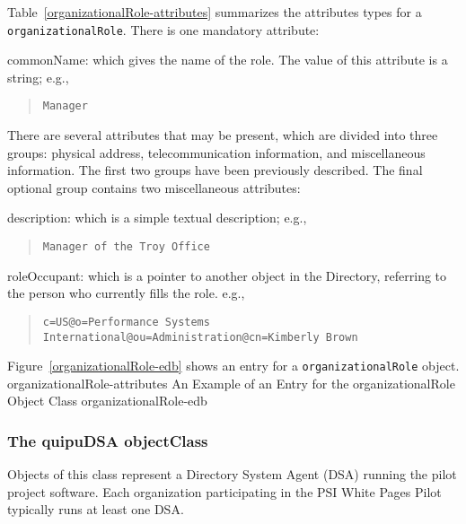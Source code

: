 Table~\ref{organizationalRole-attributes} summarizes the attributes types for
a \verb"organizationalRole".
There is one mandatory attribute:
\begin{describe}
\item[commonName:]
			which gives the name of the role.
			The value of this attribute is a string; e.g.,
\begin{quote}\small\begin{verbatim}
Manager
\end{verbatim}\end{quote}
\end{describe}
There are several attributes that may be present,
which are divided into three groups:
physical address, telecommunication information, 
and miscellaneous information.
The first two groups have been previously described.
The final optional group contains two miscellaneous attributes:
\begin{describe}
\item[description:]
			which is a simple textual description;
			e.g.,
\begin{quote}\small\begin{verbatim}
Manager of the Troy Office
\end{verbatim}\end{quote}

\item[roleOccupant:]
			which is a pointer to another object in the Directory,
			referring to the person who currently fills the role.
			e.g.,
\begin{quote}\tiny\begin{verbatim}
c=US@o=Performance Systems International@ou=Administration@cn=Kimberly Brown
\end{verbatim}\end{quote}
\end{describe}
Figure~\ref{organizationalRole-edb} shows an entry for a \verb"organizationalRole"
object.
%
	{organizationalRole-attributes}
%
	{An Example of an Entry for the organizationalRole Object Class}%
	{organizationalRole-edb}

\subsubsection	{The quipuDSA objectClass}
Objects of this class represent a Directory System Agent (DSA) running 
the pilot project software.
Each organization participating in the PSI White Pages Pilot typically
runs at least one DSA.

